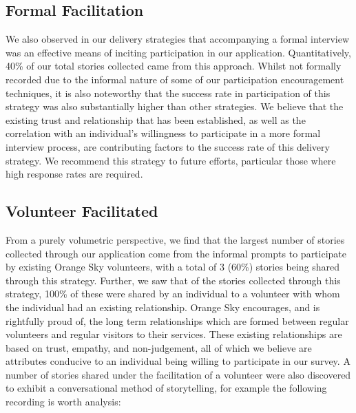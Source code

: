 \subsection{Formal Facilitation}

We also observed in our delivery strategies that accompanying a formal interview was an effective means of inciting participation in our application. Quantitatively, 40\% of our total stories collected came from this approach. Whilst not formally recorded due to the informal nature of some of our participation encouragement techniques, it is also noteworthy that the success rate in participation of this strategy was also substantially higher than other strategies. We believe that the existing trust and relationship that has been established, as well as the correlation with an individual's willingness to participate in a more formal interview process, are contributing factors to the success rate of this delivery strategy. We recommend this strategy to future efforts, particular those where high response rates are required.

\subsection{Volunteer Facilitated}

From a purely volumetric perspective, we find that the largest number of stories collected through our application come from the informal prompts to participate by existing Orange Sky volunteers, with a total of 3 (60\%) stories being shared through this strategy. Further, we saw that of the stories collected through this strategy, 100\% of these were shared by an individual to a volunteer with whom the individual had an existing relationship. Orange Sky encourages, and is rightfully proud of, the long term relationships which are formed between regular volunteers and regular visitors to their services. These existing relationships are based on trust, empathy, and non-judgement, all of which we believe are attributes conducive to an individual being willing to participate in our survey. A number of stories shared under the facilitation of a volunteer were also discovered to exhibit a conversational method of storytelling, for example the following recording is worth analysis:

